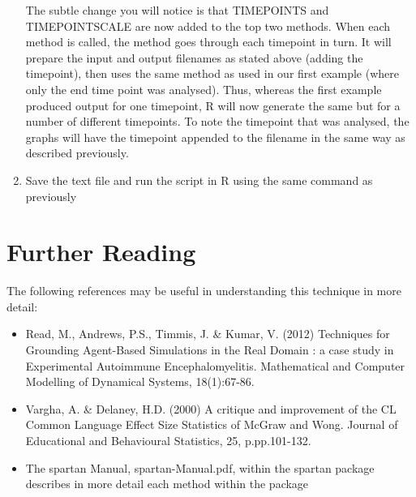\documentclass[a4paper,11pt]{article}
\begin{document}
\begin{enumerate}
The subtle change you will notice is that TIMEPOINTS and TIMEPOINTSCALE are now added to the top two methods. When each method is called, the method goes through each timepoint in turn. It will prepare the input and output filenames as stated above (adding the timepoint), then uses the same method as used in our first example (where only the end time point was analysed).  Thus, whereas the first example produced output for one timepoint, R will now generate the same but for a number of different timepoints. To note the timepoint that was analysed, the graphs will have the timepoint appended to the filename in the same way as described previously.\\

\item Save the text file and run the script in R using the same command as previously

\end{enumerate}

\section{Further Reading}
\noindent
The following references may be useful in understanding this technique in more detail:
\begin{itemize}
\item Read, M., Andrews, P.S., Timmis, J. \& Kumar, V. (2012) Techniques for Grounding Agent-Based Simulations in the Real Domain : a case study in Experimental Autoimmune Encephalomyelitis. Mathematical and Computer Modelling of Dynamical Systems, 18(1):67-86.
\item Vargha, A. \& Delaney, H.D. (2000) A critique and improvement of the CL Common Language Effect Size Statistics of McGraw and Wong. Journal of Educational and Behavioural Statistics, 25, p.pp.101-132.
\item The spartan Manual, spartan-Manual.pdf, within the spartan package describes in more detail each method within the package
\end{itemize}
\end{document}
